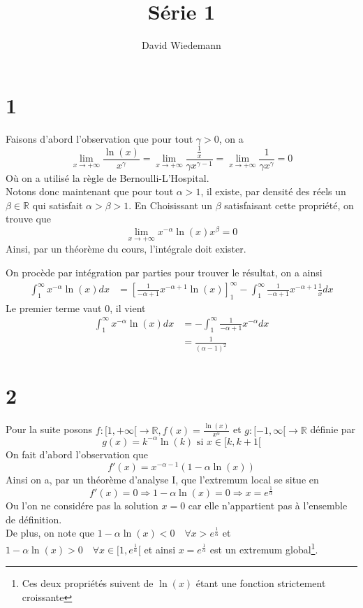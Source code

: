 \documentclass[11pt, a4paper]{article}
\begin{document}
\title{Série 1}
\author{David Wiedemann}
\maketitle
\section*{1}
Faisons d'abord l'observation que pour tout $\gamma>0$, on a
\[ 
	\lim_{x \to  + \infty} \frac{\ln( x) }{x^{\gamma}} = \lim_{x \to  + \infty} \frac{\frac{1}{x}}{\gamma x^{\gamma-1}} = \lim_{x \to  + \infty} \frac{1}{\gamma x^{\gamma}} = 0
\]
Où on a utilisé la règle de Bernoulli-L'Hospital.\\
Notons donc maintenant que pour tout $\alpha>1$, il existe, par densité des réels un $\beta \in \mathbb{R}$ qui satisfait $\alpha>\beta>1$.
En Choisissant un  $\beta$ satisfaisant cette propriété, on trouve que 
 \[ 
	 \lim_{x \to  + \infty} x^{-\alpha} \ln( x) x^{\beta} =0
\]
Ainsi, par un théorème du cours, l'intégrale doit exister.


On procède par intégration par parties pour trouver le résultat, on a ainsi
\begin{align*}
	\int_{ 1 }^{ \infty  } x^{-\alpha}\ln( x) dx &= \left[ \frac{1}{-\alpha+1}x^{-\alpha+1}\ln( x) \right]_{1}^{ \infty } - \int_{ 1 }^{ \infty  } \frac{1}{-\alpha+1}x^{-\alpha+1} \frac{1}{x} dx
\end{align*}
Le premier terme vaut 0, il vient
\begin{align*}
	\int_{ 1 }^{ \infty  } x^{-\alpha}\ln( x) dx &=  - \int_{ 1 }^{ \infty  } \frac{1}{-\alpha+1}x^{-\alpha}  dx\\
						     &=  \frac{1}{( \alpha-1) ^{2}} 
\end{align*}
\section*{2}
Pour la suite posons $f: [ 1, + \infty[ \to \mathbb{R},f(x) = \frac{\ln( x) }{x^{\alpha}}$ et $g:[-1, \infty[ \to \mathbb{R}$ définie par
\[ 
	g( x) = k^{-\alpha}\ln( k)  \text{ si } x \in [ k,k+1[ 
\]
On fait d'abord l'observation que 
\[ 
	f'( x) = x^{-\alpha-1}\left( 1- \alpha \ln( x) \right) 
\]
Ainsi on a, par un théorème d'analyse I, que l'extremum local se situe en 
\[ 
	f'( x) =0 \Rightarrow 	1 - \alpha \ln( x) = 0 \Rightarrow x = e^{\frac{1}{\alpha}} 
\]
Ou l'on ne considére pas la solution $x=0$ car elle n'appartient pas à l'ensemble de définition.\\
De plus, on note que $1-\alpha \ln( x) <0 \quad \forall x> e^{\frac{1}{\alpha}}$ et $1-\alpha \ln( x) >0 \quad \forall x \in [ 1, e^{\frac{1}{\alpha}}[ $ et ainsi $x= e^{\frac{1}{\alpha}}$ est un extremum global\footnote{Ces deux propriétés suivent de $\ln( x) $ étant une fonction strictement croissante}.\\
\end{document}
